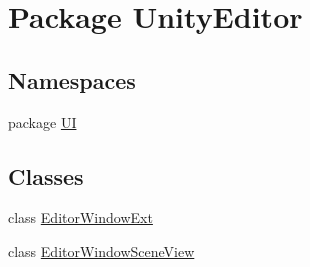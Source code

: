 \hypertarget{namespace_unity_editor}{}\section{Package Unity\+Editor}
\label{namespace_unity_editor}
\subsection*{Namespaces}
\begin{DoxyCompactItemize}
\item 
package \hyperlink{namespace_unity_editor_1_1_u_i}{U\+I}
\end{DoxyCompactItemize}
\subsection*{Classes}
\begin{DoxyCompactItemize}
\item 
class \hyperlink{class_unity_editor_1_1_editor_window_ext}{Editor\+Window\+Ext}
\item 
class \hyperlink{class_unity_editor_1_1_editor_window_scene_view}{Editor\+Window\+Scene\+View}
\end{DoxyCompactItemize}
